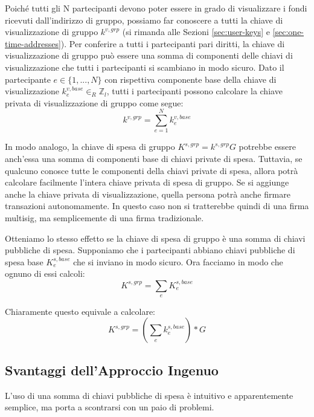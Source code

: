 Poiché tutti gli N partecipanti devono poter essere in grado di visualizzare i fondi ricevuti dall'indirizzo di gruppo, possiamo far conoscere a tutti la chiave di visualizzazione di gruppo $k^{v,grp}$ (si rimanda alle Sezioni \ref{sec:user-keys} e \ref{sec:one-time-addresses}). Per conferire a tutti i partecipanti pari diritti, la chiave di visualizzazione di gruppo può essere una somma di componenti delle chiavi di visualizzazione che tutti i partecipanti si scambiano in modo sicuro. Dato il partecipante $e \in \{1,...,N\}$ con rispettiva componente base della chiave di visualizzazione $k^{v,base}_e \in_R \mathbb{Z}_l$, tutti i partecipanti possono calcolare la chiave privata di visualizzazione di gruppo come segue:
\[k^{v,grp} = \sum^{N}_{e=1} k^{v,base}_e\]

In modo analogo, la chiave di spesa di gruppo $K^{s,grp} = k^{s,grp} G$ potrebbe essere anch'essa una somma di componenti base di chiavi private di spesa. Tuttavia, se qualcuno conosce tutte le componenti della chiavi private di spesa, allora potrà calcolare facilmente l'intera chiave privata di spesa di gruppo. Se si aggiunge anche la chiave privata di visualizzazione, quella persona potrà anche firmare transazioni autonomamente. In questo caso non si tratterebbe quindi di una firma multisig, ma semplicemente di una firma tradizionale.

Otteniamo lo stesso effetto se la chiave di spesa di gruppo è una somma di chiavi pubbliche di spesa. Supponiamo che i partecipanti abbiano chiavi pubbliche di spesa base $K^{s,base}_e$ che si inviano in modo sicuro. Ora facciamo in modo che ognuno di essi calcoli:
\[K^{s,grp} = \sum_e K^{s,base}_e\]

Chiaramente questo equivale a calcolare:
\[K^{s,grp} = (\sum_e k^{s,base}_e)*G\]


\subsection{Svantaggi dell'Approccio Ingenuo}
\label{subsec:drawbacks-naive-aggregation-cancellation}

L'uso di una somma di chiavi pubbliche di spesa è intuitivo e apparentemente semplice, ma porta a scontrarsi con un paio di problemi.

